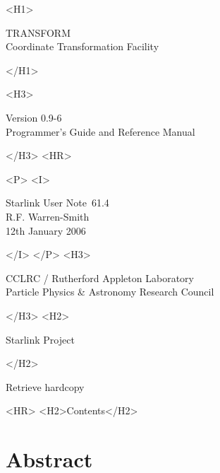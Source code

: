 \documentclass[twoside,11pt]{article}
\newcommand{\stardoccategory}  {Starlink User Note}
\newcommand{\stardocsource}    {sun\stardocnumber}
\newcommand{\stardocnumber}    {61.4}
\newcommand{\stardocauthors}   {R.F. Warren-Smith}
\newcommand{\stardocdate}      {12th January 2006}
\newcommand{\stardoctitle}     {TRANSFORM \latexhtml{\\[2.5ex]}{\\}
                                Coordinate Transformation Facility}
\newcommand{\stardocversion}   {Version 0.9-6}
\newcommand{\stardocmanual}    {Programmer's Guide and Reference Manual}
\newcommand{\htmladdnormallink}[2]{#1}
\newcommand{\htmladdimg}[1]{}
\newcommand{\htmlref}[2]{#1}
\newcommand{\htmladdtonavigation}[1]{}
\newcommand{\latexhtml}[2]{#1}
\newcommand{\xlabel}[1]{}
\renewcommand{\_}{\texttt{\symbol{95}}}
\begin{document}
\begin{htmlonly}
   \xlabel{}
   \begin{rawhtml} <H1> \end{rawhtml}
      \stardoctitle
   \begin{rawhtml} </H1> \end{rawhtml}
   \begin{rawhtml} <H3> \end{rawhtml}
      \stardocversion \\
      \stardocmanual
   \begin{rawhtml} </H3> <HR> \end{rawhtml}


   \begin{rawhtml} <P> <I> \end{rawhtml}
   \stardoccategory\ \stardocnumber \\
   \stardocauthors \\
   \stardocdate
   \begin{rawhtml} </I> </P> <H3> \end{rawhtml}
      \htmladdnormallink{CCLRC / Rutherford Appleton Laboratory}
                        {http://www.cclrc.ac.uk} \\
      \htmladdnormallink{Particle Physics \& Astronomy Research Council}
                        {http://www.pparc.ac.uk} \\
   \begin{rawhtml} </H3> <H2> \end{rawhtml}
      \htmladdnormallink{Starlink Project}{http://www.starlink.rl.ac.uk/}
   \begin{rawhtml} </H2> \end{rawhtml}
   \htmladdnormallink{\htmladdimg{source.gif} Retrieve hardcopy}
      {http://www.starlink.rl.ac.uk/cgi-bin/hcserver?\stardocsource}\\

  \label{stardoccontents}
  \begin{rawhtml}
    <HR>
    <H2>Contents</H2>
  \end{rawhtml}
  \htmladdtonavigation{\htmlref{\htmladdimg{contents_motif.gif}}
        {stardoccontents}}

  \section{\xlabel{abstract}Abstract}
\end{htmlonly}
\end{document}
